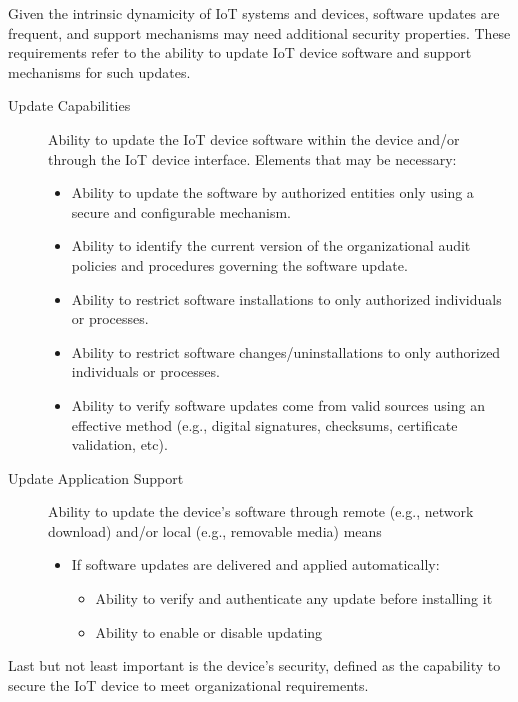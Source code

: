     Given the intrinsic dynamicity of IoT systems and devices, software updates are frequent, and support mechanisms may need additional security properties. These requirements refer to the ability to update IoT device software and support mechanisms for such updates.
    \begin{description}
        \item[Update Capabilities] Ability to update the IoT device software within the device and/or through the IoT device interface. Elements that may be necessary:
        \begin{itemize}
            \item Ability to update the software by authorized entities only using a secure and configurable mechanism.
            \item Ability to identify the current version of the organizational audit policies and procedures governing the software update.
            \item Ability to restrict software installations to only authorized individuals or processes.
            \item Ability to restrict software changes/uninstallations to only authorized individuals or processes.
            \item Ability to verify software updates come from valid sources using an effective method (e.g., digital signatures, checksums, certificate validation, etc).
        \end{itemize}
        
        \item[Update Application Support] Ability to update the device’s software through remote (e.g., network download) and/or local (e.g., removable media) means
        \begin{itemize}
            \item If software updates are delivered and applied automatically:
            \begin{itemize}
                \item Ability to verify and authenticate any update before installing it
                \item Ability to enable or disable updating
            \end{itemize}
        \end{itemize}
    \end{description}
    
    
    
    Last but not least important is the device's security, defined as the capability to secure the IoT device to meet organizational requirements.
    
